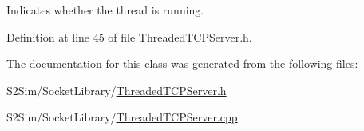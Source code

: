 Indicates whether the thread is running. 



Definition at line 45 of file Threaded\-T\-C\-P\-Server.\-h.



The documentation for this class was generated from the following files\-:\begin{DoxyCompactItemize}
\item 
S2\-Sim/\-Socket\-Library/\hyperlink{_threaded_t_c_p_server_8h}{Threaded\-T\-C\-P\-Server.\-h}\item 
S2\-Sim/\-Socket\-Library/\hyperlink{_threaded_t_c_p_server_8cpp}{Threaded\-T\-C\-P\-Server.\-cpp}\end{DoxyCompactItemize}
